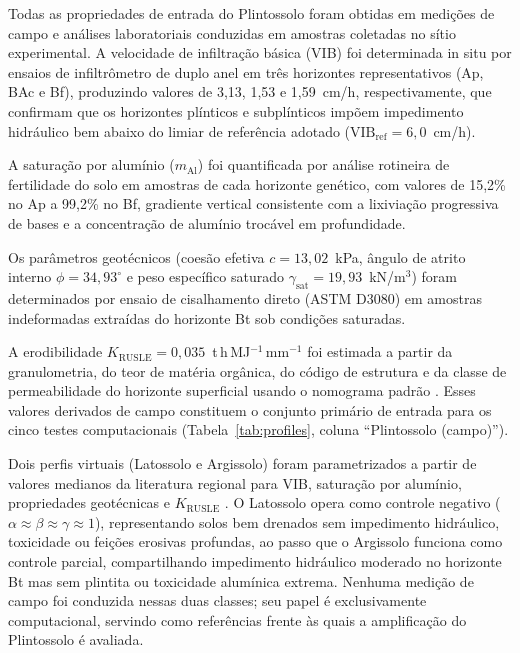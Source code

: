 \documentclass[preprint,review,12pt,authoryear]{elsarticle}
\begin{document}
Todas as propriedades de entrada do Plintossolo foram obtidas em medições de campo e análises laboratoriais conduzidas em amostras coletadas no sítio experimental. A velocidade de infiltração básica (VIB) foi determinada in situ por ensaios de infiltrômetro de duplo anel em três horizontes representativos (Ap, BAc e Bf), produzindo valores de 3,13, 1,53 e 1,59~cm/h, respectivamente, que confirmam que os horizontes plínticos e subplínticos impõem impedimento hidráulico bem abaixo do limiar de referência adotado ($\mathrm{VIB_{ref}} = 6{,}0$~cm/h). 

A saturação por alumínio ($m_{\mathrm{Al}}$) foi quantificada por análise rotineira de fertilidade do solo em amostras de cada horizonte genético, com valores de 15,2\% no Ap a 99,2\% no Bf, gradiente vertical consistente com a lixiviação progressiva de bases e a concentração de alumínio trocável em profundidade. 

Os parâmetros geotécnicos (coesão efetiva $c = 13{,}02$~kPa, ângulo de atrito interno $\phi = 34{,}93^\circ$ e peso específico saturado $\gamma_{\mathrm{sat}} = 19{,}93$~kN/m$^3$) foram determinados por ensaio de cisalhamento direto (ASTM D3080) em amostras indeformadas extraídas do horizonte Bt sob condições saturadas. 

A erodibilidade $K_{\mathrm{RUSLE}} = 0{,}035$~t\,h\,MJ$^{-1}$\,mm$^{-1}$ foi estimada a partir da granulometria, do teor de matéria orgânica, do código de estrutura e da classe de permeabilidade do horizonte superficial usando o nomograma padrão \citep{wischmeier_et_al_1971}. Esses valores derivados de campo constituem o conjunto primário de entrada para os cinco testes computacionais (Tabela~\ref{tab:profiles}, coluna ``Plintossolo (campo)'').

Dois perfis virtuais (Latossolo e Argissolo) foram parametrizados a partir de valores medianos da literatura regional para VIB, saturação por alumínio, propriedades geotécnicas e $K_{\mathrm{RUSLE}}$ \citep{silva_et_al_2009,bertoni_lombardi_neto_2017}. O Latossolo opera como controle negativo ($\alpha \approx \beta \approx \gamma \approx 1$), representando solos bem drenados sem impedimento hidráulico, toxicidade ou feições erosivas profundas, ao passo que o Argissolo funciona como controle parcial, compartilhando impedimento hidráulico moderado no horizonte Bt mas sem plintita ou toxicidade alumínica extrema. Nenhuma medição de campo foi conduzida nessas duas classes; seu papel é exclusivamente computacional, servindo como referências frente às quais a amplificação do Plintossolo é avaliada.
\end{document}
